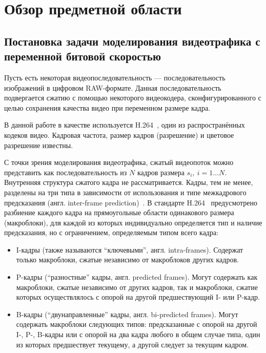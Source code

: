 \section{Обзор предметной области}
\subsection{Постановка задачи моделирования видеотрафика
с переменной битовой скоростью}

Пусть есть некоторая видеопоследовательность ---
последовательность изображений в цифровом RAW-формате.
Данная последовательность подвергается сжатию с помощью
некоторого видеокодера, сконфигурированного с целью
сохранения качества видео при переменном размере кадра.

В данной работе в качестве
используется H.264~\cite{h264spec}, один из распространённых
кодеков видео. Кадровая частота, размер кадров (разрешение)
и цветовое разрешение известны.

С точки зрения моделирования видеотрафика, сжатый видеопоток
можно представить как последовательность из $N$ кадров
размера $s_i,~i=1\dots N$. Внутренняя структура сжатого
кадра не рассматривается. Кадры, тем не менее, разделены
на три типа в зависимости от использования и типе межкадрового
предсказания (англ. inter-frame prediction)~\cite{salomoncomp}.
В стандарте H.264~\cite{h264spec} предусмотрено разбиение каждого
кадра на прямоугольные области одинакового размера (макроблоки),
для каждой из которых индивидуально определяется тип и наличие
предсказания, но с ограничением, определяемым типом всего кадра:

\begin{itemize}
    \item I-кадры (также называются ``ключевыми'', англ. intra-frames).
        Содержат только макроблоки, сжатые независимо от макроблоков
        других кадров.
    \item P-кадры (``разностные'' кадры, англ. predicted frames).
        Могут содержать как макроблоки, сжатые независимо от других
        кадров, так и макроблоки, сжатие которых осуществлялось с
        опорой на другой предшествующий I- или P-кадр.
    \item B-кадры (``двунаправленные'' кадры, англ. bi-predicted frames).
        Могут содержать макроблоки следующих типов: предсказанные с опорой
        на другой I-, P-, B-кадры или с опорой на два кадра любого в
        общем случае типа, один из которых предшествует текущему,
        а другой следует за текущим кадром.
\end{itemize}

